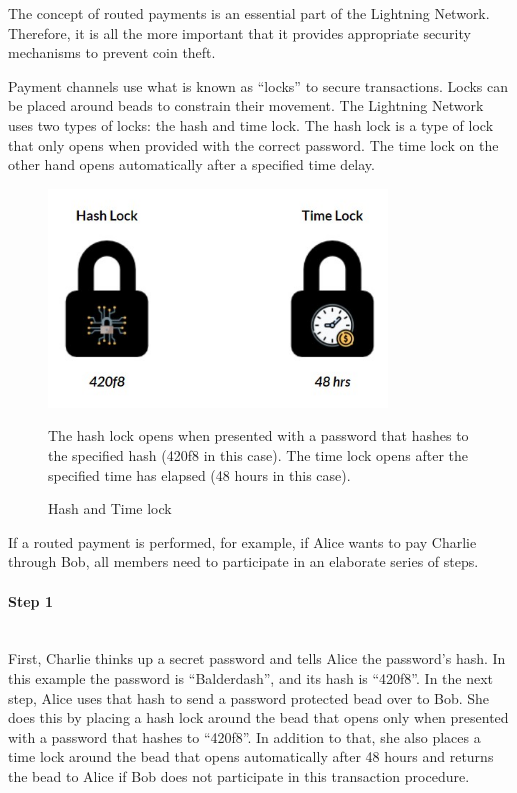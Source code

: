 \documentclass[a4paper, 12pt]{report}
\begin{document}
\par The concept of routed payments is an essential part of the Lightning Network. Therefore, it is all the more important that it provides appropriate security mechanisms to prevent coin theft.

\par Payment channels use what is known as “locks” to secure transactions. Locks can be placed around beads to constrain their movement. The Lightning Network uses two types of locks: the hash and time lock. The hash lock is a type of lock that only opens when provided with the correct password. The time lock on the other hand opens automatically after a specified time delay.\cite{peter}

\begin{figure}[H]
	\centering
	\includegraphics[width=9cm]{10_Locks}
	\caption{Hash and Time lock}
	\medskip
	\small The hash lock opens when presented with a password that hashes to the specified hash (420f8 in this case). The time lock opens after the specified time has elapsed (48 hours in this case).
	\label{fig:10_Locks}
\end{figure}

\par If a routed payment is performed, for example, if Alice wants to pay Charlie through Bob, all members need to participate in an elaborate series of steps.

\paragraph{Step 1} \hspace{0pt} \\
First, Charlie thinks up a secret password and tells Alice the password’s hash. In this example the password is “Balderdash”, and its hash is “420f8”. In the next step, Alice uses that hash to send a password protected bead over to Bob. She does this by placing a hash lock around the bead that opens only when presented with a password that hashes to “420f8”. In addition to that, she also places a time lock around the bead that opens automatically after 48 hours and returns the bead to Alice if Bob does not participate in this transaction procedure.
\end{document}
